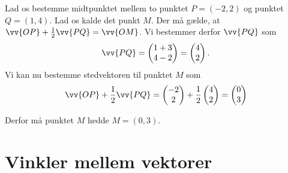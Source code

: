 \begin{exa}
Lad os bestemme midtpunktet mellem to punktet $P = (-2,2)$ og punktet $Q = (1,4)$. Lad os kalde det punkt $M$. Der må gælde, at $\vv{OP} + \frac{1}{2}\vv{PQ} = \vv{OM}$. Vi bestemmer derfor $\vv{PQ}$ som
\begin{align*}
\vv{PQ} = \begin{pmatrix} 1+3\\4-2 
 \end{pmatrix} = \begin{pmatrix}
 4\\ 2
 \end{pmatrix}.
\end{align*}
Vi kan nu bestemme stedvektoren til punktet $M$ som
\begin{align*}
\vv{OP} + \frac{1}{2} \vv{PQ} = \begin{pmatrix}
-2 \\ 2
\end{pmatrix} + \frac{1}{2}\begin{pmatrix}
4 \\ 2
\end{pmatrix}  = \begin{pmatrix}
0 \\ 3
\end{pmatrix} 
\end{align*}

Derfor må punktet $M$ hedde $M = (0,3)$.
\end{exa}

\section*{Vinkler mellem vektorer}

